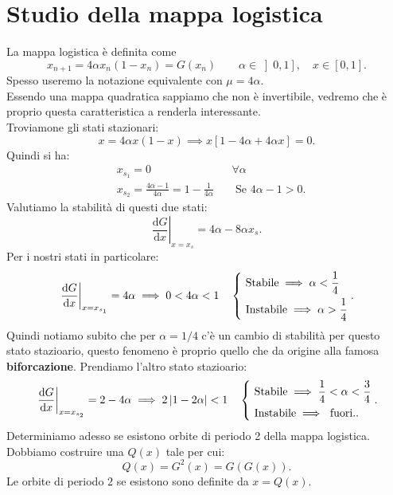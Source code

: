 \section{Studio della mappa logistica}%
La mappa logistica è definita come
\[
x_{n+1} = 4\alpha x_n(1-x_n) = G(x_n) \qquad  \alpha  \in \left] 0, 1\right], \quad  x \in \left[0, 1\right]
.\] 
Spesso useremo la notazione equivalente con $\mu =4\alpha$.\\
Essendo una mappa quadratica sappiamo che non è invertibile, vedremo che è proprio questa caratteristica a renderla interessante.\\
Troviamone gli stati stazionari:
\[
    x = 4\alpha x(1-x) \implies  x\left[1-4\alpha + 4\alpha x\right] = 0
.\] 
Quindi si ha:
\[\begin{aligned}
    &x_{s_1}=0  && \forall \alpha \\
    &x_{s_2} = \frac{4\alpha-1}{4\alpha} = 1 - \frac{1}{4\alpha} && \text{ Se } 4\alpha-1 > 0
.\end{aligned}\]
Valutiamo la stabilità di questi due stati:
\[
    \left. \frac{\text{d} G}{\text{d} x} \right|_{x = x_{s}} = 4\alpha  - 8 \alpha  x_s
.\] 
Per i nostri stati in particolare:
\[
    \left. \frac{\text{d} G}{\text{d} x} \right|_{x=x_{s_1}} = 4\alpha  \implies  0 < 4\alpha  < 1 \quad
	\begin{dcases}
	\text{ Stabile} \implies  \alpha  < \frac{1}{4}\\
	\text{ Instabile} \implies  \alpha  > \frac{1}{4}\\
	\end{dcases}
.\] 
Quindi notiamo subito che per $\alpha  = 1 /4$ c'è un cambio di stabilità per questo stato stazioario, questo fenomeno è proprio quello che da origine alla famosa \textbf{biforcazione}. Prendiamo l'altro stato stazioario:
\[
    \left. \frac{\text{d} G}{\text{d} x} \right|_{x=x_{s_2}} = 2-4\alpha  \implies  2 \left|1-2\alpha\right| < 1 
	\quad 
	\begin{dcases}
	\text{ Stabile} \implies  \frac{1}{4}< \alpha  < \frac{3}{4}\\
	\text{ Instabile} \implies  \text{ fuori..}
	\end{dcases}
.\] 
Determiniamo adesso se esistono orbite di periodo 2 della mappa logistica. Dobbiamo costruire una $Q(x)$ tale per cui:
\[
    Q(x)  = G^2(x) = G(G(x)) 
.\] 
Le orbite di periodo $2$ se esistono sono definite da $x = Q(x)$. \\
